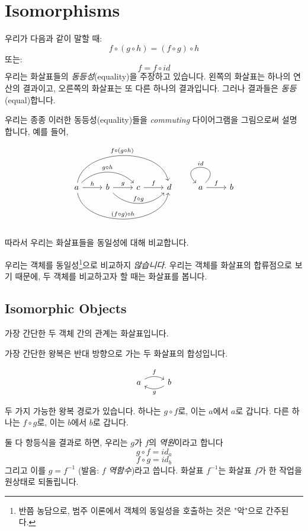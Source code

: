\documentclass[DaoFP]{subfiles}
\begin{document}
\setcounter{chapter}{2}


\chapter{Isomorphisms}

우리가 다음과 같이 말할 때:
\[f \circ (g \circ h) = (f \circ g) \circ h \]
또는:
\[ f = f \circ id \]
우리는 화살표들의 \emph{동등성}(equality)을 주장하고 있습니다. 왼쪽의 화살표는 하나의 연산의 결과이고, 오른쪽의 화살표는 또 다른 하나의 결과입니다. 그러나 결과들은 \emph{동등}(equal)합니다.

우리는 종종 이러한 동등성(equality)들을 \emph{commuting} 다이어그램을 그림으로써 설명합니다, 예를 들어,

\[
 \begin{tikzcd}
 a
 \arrow[r, "h"]
 \arrow[rr, bend left=45, "g \circ h"]
 \arrow[rrr, bend left=80, "f \circ (g \circ h)"]
 \arrow[rrr, bend right=80, "(f \circ g) \circ h"]
 & b
 \arrow[r, "g"]
 \arrow[rr, bend right=45, "f \circ g"]
 &c
 \arrow[r, "f"]
 &d
 \end{tikzcd}
 \begin{tikzcd}
 a
 \arrow[r, "f"]
 \arrow[r, loop, "id"']
 &b
 \end{tikzcd}
\]

따라서 우리는 화살표들을 동일성에 대해 비교합니다.

우리는 객체를 동일성\footnote{반쯤 농담으로, 범주 이론에서 객체의 동일성을 호출하는 것은 "악"으로 간주된다.}으로 비교하지 \emph{않습니다}. 우리는 객체를 화살표의 합류점으로 보기 때문에, 두 객체를 비교하고자 할 때는 화살표를 봅니다.

\section{Isomorphic Objects}

가장 간단한 두 객체 간의 관계는 화살표입니다.

가장 간단한 왕복은 반대 방향으로 가는 두 화살표의 합성입니다.

\[
 \begin{tikzcd}
 a
 \arrow[r, bend left, "f"]
 & b
 \arrow[l, bend left, "g"]
 \end{tikzcd}
\]

두 가지 가능한 왕복 경로가 있습니다. 하나는 $g \circ f$로, 이는 $a$에서 $a$로 갑니다. 다른 하나는 $f \circ g$로, 이는 $b$에서 $b$로 갑니다.

둘 다 항등식을 결과로 하면, 우리는 $g$가 $f$의 \emph{역원}이라고 합니다
\[ g \circ f = id_a\]
\[f \circ g = id_b\]
그리고 이를 $g = f^{-1}$ (발음: $f$ \emph{역함수})라고 씁니다. 화살표 $f^{-1}$는 화살표 $f$가 한 작업을 원상태로 되돌립니다.
\end{document}
